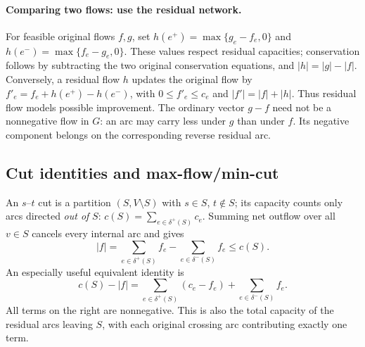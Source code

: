 \paragraph{Comparing two flows: use the residual network.}
For feasible original flows $f,g$, set $h(e^+)=\max\{g_e-f_e,0\}$ and
$h(e^-)=\max\{f_e-g_e,0\}$. These values respect residual capacities;
conservation follows by subtracting the two original conservation equations,
and $|h|=|g|-|f|$. Conversely, a residual flow $h$ updates the original flow by
$f'_e=f_e+h(e^+)-h(e^-)$, with $0\le f'_e\le c_e$ and
$|f'|=|f|+|h|$. Thus residual flow models possible improvement.
The ordinary vector $g-f$ need not be a nonnegative flow in $G$: an arc may
carry less under $g$ than under $f$. Its negative component belongs on the
corresponding reverse residual arc.

\subsection{Cut identities and max-flow/min-cut}\label{nf:cuts}
An $s$--$t$ cut is a partition $(S,V\setminus S)$ with $s\in S$, $t\notin S$;
its capacity counts only arcs directed \emph{out of} $S$:
$c(S)=\sum_{e\in\delta^+(S)}c_e$.
Summing net outflow over all $v\in S$ cancels every internal arc and gives
\begin{equation}\label{nf:cut-identity}
 \boxed{|f|=\sum_{e\in\delta^+(S)}f_e-\sum_{e\in\delta^-(S)}f_e\le c(S).}
\end{equation}
An especially useful equivalent identity is
\begin{equation}\label{nf:cut-slack}
 \boxed{c(S)-|f|=
 \sum_{e\in\delta^+(S)}(c_e-f_e)+\sum_{e\in\delta^-(S)}f_e.}
\end{equation}
All terms on the right are nonnegative. This is also the total capacity
of the residual arcs leaving $S$, with each original crossing arc contributing
exactly one term.

